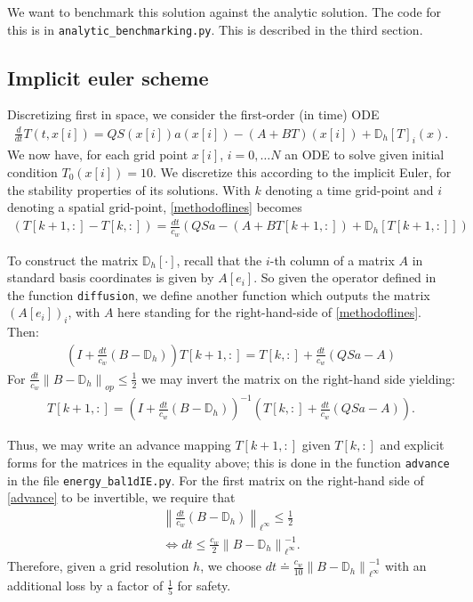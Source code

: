 \documentclass{article}
\theoremstyle{remark}
\newcommand{\norm}[1]{\left\lVert#1\right\rVert}
\begin{document}
We want to benchmark this solution against the analytic solution. The code for this is in
\verb+analytic_benchmarking.py+. This is described in the third section.



\subsection{Implicit euler scheme}

Discretizing first in space, we consider the first-order (in time) ODE 
\begin{align}\label{methodoflines}
	\frac{d}{dt} T(t,x[i]) = QS(x[i])a(x[i]) - (A+BT)(x[i]) + \mathbb{D}_h[T]_i(x).
\end{align}
We now have, for each grid point $x[i]$, $i = 0, \ldots N$ an ODE to solve given
initial condition $T_0(x[i]) = 10$. We discretize this according to the implicit
Euler, for the stability properties of its solutions. With $k$ denoting a time
grid-point and $i$ denoting a spatial grid-point, \eqref{methodoflines}
becomes
\begin{align}\label{fully_discretized}
	(T[k+1,:] - T[k,:] ) = \frac{dt}{c_w} \left( QSa - (A+BT[k+1,:]) + \mathbb{D}_h[T[k+1,:]] \right)
\end{align}

To construct the matrix $\mathbb{D}_h[\cdot]$, recall that the $i$-th column of
a matrix $A$ in standard basis coordinates is given by $A[e_i]$. So given the operator
defined in the function \verb+diffusion+, we define another function which outputs
the matrix $(A[e_i])_i$, with $A$ here standing for the right-hand-side of
\eqref{methodoflines}. Then:
\begin{align}
	\left( I + \frac{dt}{c_w} \left( B - \mathbb{D}_h \right) \right) T[k+1,:] 
	= T[k,:] + \frac{dt}{c_w} \left( QSa - A \right)
\end{align}
For $\frac{dt}{c_w}\norm{ B - \mathbb{D}_h }_{op} \leq \frac{1}{2}$ we may invert
the matrix on the right-hand side yielding:
\begin{align}\label{advance}
	T[k+1,:] = \left( I + \frac{dt}{c_w} \left( B - \mathbb{D}_h \right) \right)^{-1}
				\left( T[k,:] + \frac{dt}{c_w} \left( QSa - A \right) \right).
\end{align}

Thus, we may write an advance mapping $T[k+1,:]$ given $T[k,:]$ and explicit forms 
for the matrices in the equality above; this is done in the function \verb+advance+
in the file \verb+energy_bal1dIE.py+. For the first matrix on the right-hand side of
\eqref{advance} to be invertible, we require that
\begin{align}
	\norm{ \frac{dt}{c_w} \left( B - \mathbb{D}_h \right) }_{\ell^\infty} \leq \frac{1}{2}	\\
	\Leftrightarrow dt \leq \frac{c_w}{2} \norm{B - \mathbb{D}_h }_{\ell^\infty}^{-1}.
\end{align}
Therefore, given a grid resolution $h$, we choose 
$dt \doteq \frac{c_w}{10} \norm{B - \mathbb{D}_h }_{\ell^\infty}^{-1}$ with an additional
loss by a factor of $\frac{1}{5}$ for safety.
\end{document}
